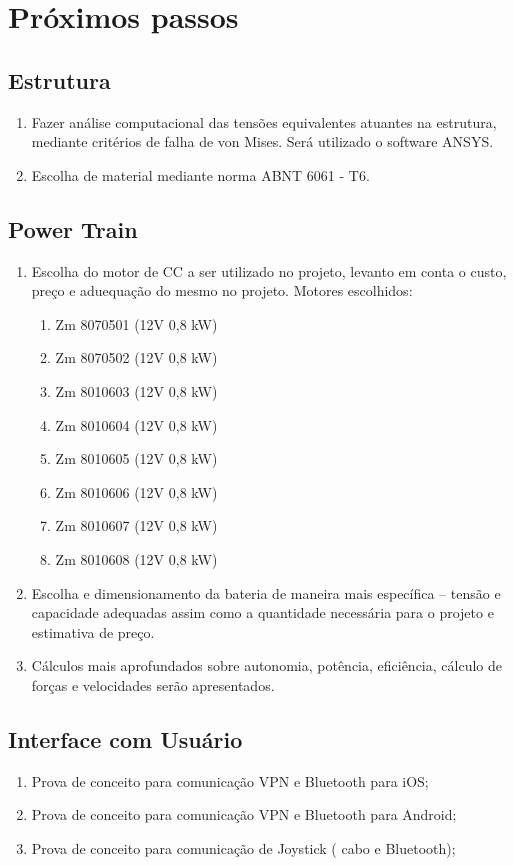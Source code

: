 \section{Próximos passos}
  \subsection{Estrutura}
    \begin{enumerate}
      \item Fazer análise computacional das tensões equivalentes atuantes na estrutura, mediante critérios de falha de von Mises. Será utilizado o software ANSYS.
      \item Escolha de material mediante norma ABNT 6061 - T6.
    \end{enumerate}
  \subsection{Power Train}
    \begin{enumerate}
      \item Escolha do motor de CC a ser utilizado no projeto, levanto em conta o custo, preço e aduequação do mesmo no projeto. Motores escolhidos:
      \begin{enumerate}
        \item Zm 8070501 (12V 0,8 kW)
        \item Zm 8070502 (12V 0,8 kW)
        \item Zm 8010603 (12V 0,8 kW)
        \item Zm 8010604 (12V 0,8 kW)
        \item Zm 8010605 (12V 0,8 kW)
        \item Zm 8010606 (12V 0,8 kW)
        \item Zm 8010607 (12V 0,8 kW)
        \item Zm 8010608 (12V 0,8 kW)
      \end{enumerate}
    \item Escolha e dimensionamento da bateria de maneira mais específica – tensão e capacidade adequadas assim como a quantidade necessária para o projeto e estimativa de preço.
    \item Cálculos mais aprofundados sobre autonomia, potência, eficiência, cálculo de forças e velocidades serão apresentados.
    \end{enumerate}
  \subsection{Interface com Usuário}
    \begin{enumerate}
      \item Prova de conceito para comunicação VPN e Bluetooth para iOS;
      \item Prova de conceito para comunicação VPN e Bluetooth para Android;
      \item Prova de conceito para comunicação de Joystick ( cabo e Bluetooth);
    \end{enumerate}
